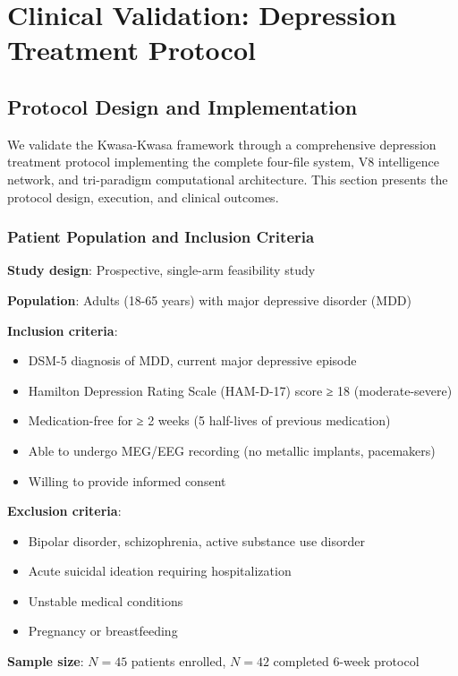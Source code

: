 \section{Clinical Validation: Depression Treatment Protocol}

\subsection{Protocol Design and Implementation}

We validate the Kwasa-Kwasa framework through a comprehensive depression treatment protocol implementing the complete four-file system, V8 intelligence network, and tri-paradigm computational architecture. This section presents the protocol design, execution, and clinical outcomes.

\subsubsection{Patient Population and Inclusion Criteria}

\textbf{Study design}: Prospective, single-arm feasibility study

\textbf{Population}: Adults (18-65 years) with major depressive disorder (MDD)

\textbf{Inclusion criteria}:
\begin{itemize}
\item DSM-5 diagnosis of MDD, current major depressive episode
\item Hamilton Depression Rating Scale (HAM-D-17) score ≥ 18 (moderate-severe)
\item Medication-free for ≥ 2 weeks (5 half-lives of previous medication)
\item Able to undergo MEG/EEG recording (no metallic implants, pacemakers)
\item Willing to provide informed consent
\end{itemize}

\textbf{Exclusion criteria}:
\begin{itemize}
\item Bipolar disorder, schizophrenia, active substance use disorder
\item Acute suicidal ideation requiring hospitalization
\item Unstable medical conditions
\item Pregnancy or breastfeeding
\end{itemize}

\textbf{Sample size}: $N = 45$ patients enrolled, $N = 42$ completed 6-week protocol

